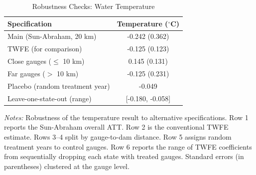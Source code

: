 \begin{table}[t]
\centering
\caption{Robustness Checks: Water Temperature}
\label{tab:robust}
\begin{tabular}{lc}
\hline\hline
Specification & Temperature ($^{\circ}$C) \\
\hline
Main (Sun-Abraham, 20 km) & -0.242 (0.362) \\
TWFE (for comparison) & -0.125 (0.123) \\
Close gauges ($\leq$ 10 km) & 0.145 (0.131) \\
Far gauges ($>$ 10 km) & -0.125 (0.231) \\
Placebo (random treatment year) & -0.049 \\
Leave-one-state-out (range) & [-0.180, -0.058] \\
\hline\hline
\end{tabular}
\begin{tablenotes}
\small
\item \textit{Notes:} Robustness of the temperature result to alternative specifications. Row 1 reports the Sun-Abraham overall ATT. Row 2 is the conventional TWFE estimate. Rows 3--4 split by gauge-to-dam distance. Row 5 assigns random treatment years to control gauges. Row 6 reports the range of TWFE coefficients from sequentially dropping each state with treated gauges. Standard errors (in parentheses) clustered at the gauge level.
\end{tablenotes}
\end{table}

